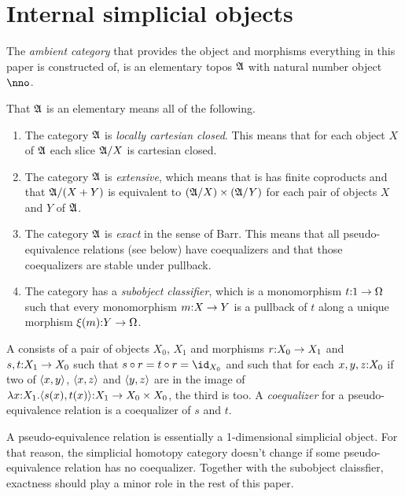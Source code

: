 \documentclass[csh.tex]{subfiles}
\begin{document}
\section{Internal simplicial objects}
The \emph{ambient category} that provides the object and morphisms everything 
in this paper is constructed of, is an elementary topos $\mathfrak A$ with natural 
number object $\nno$. 

\begin{definition} 
  That $\mathfrak A$ is an elementary  means all of the following.
  
  \begin{enumerate}
  \item The category $\mathfrak A$ is \emph{locally cartesian closed}. This means 
  that for each object $X$ of $\mathfrak A$ each slice $\mathfrak A/X$ is cartesian 
  closed.
  \item The category $\mathfrak A$ is \emph{extensive}, which means that is has 
  finite coproducts and that $\mathfrak A/(X+Y)$ is equivalent to 
  $(\mathfrak A/X)\times(\mathfrak A/Y)$ for each pair of objects $X$ and $Y$ of 
  $\mathfrak A$.
  \item The category $\mathfrak A$ is \emph{exact} in the sense of Barr. This 
  means that all pseudo-equivalence relations (see below) have coequalizers and 
  that those coequalizers are stable under pullback.
  \item The category has a \emph{subobject classifier}, which is a monomorphism
  $t\mathord : 1\to \Omega$ such that every monomorphism $m\mathord : X\to Y$ is a pullback of
  $t$ along a unique morphism $\xi(m)\mathord : Y\to \Omega$.
  \end{enumerate}
  
  A  consists of a pair of objects $X_0$, 
  $X_1$ and morphisms $r\mathord : X_0\to X_1$ and $s,t\mathord : X_1\to X_0$ such that 
  $s\circ r= t\circ r = \id_{X_0}$ and such that for each $x,y,z\mathord : X_0$ if two 
  of $\left\langle x,y \right\rangle$, $\left\langle x,z \right\rangle$ and $\left\langle y,z \right\rangle$ are in the image of 
  $\lambda x\mathord : X_1 .{\left\langle s(x),t(x) \right\rangle}\mathord : X_1\to X_0\times X_0$, the third 
  is too. A \emph{coequalizer} for a pseudo-equivalence relation is a 
  coequalizer of $s$ and $t$.
\end{definition}

\begin{remark} A pseudo-equivalence relation is essentially a 1-dimensional 
  simplicial object. For that reason, the simplicial homotopy category doesn't
  change if some pseudo-equivalence relation has no coequalizer. Together with
  the subobject claissfier, exactness should play a minor role in the rest of
  this paper.
\end{remark}
\end{document}
